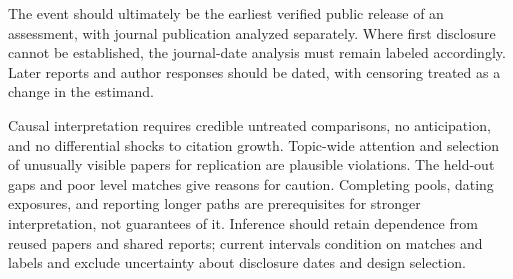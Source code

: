 The event should ultimately be the earliest verified public release of an assessment, with journal publication analyzed separately. Where first disclosure cannot be established, the journal-date analysis must remain labeled accordingly. Later reports and author responses should be dated, with censoring treated as a change in the estimand.

Causal interpretation requires credible untreated comparisons, no anticipation, and no differential shocks to citation growth. Topic-wide attention and selection of unusually visible papers for replication are plausible violations. The held-out gaps and poor level matches give reasons for caution. Completing pools, dating exposures, and reporting longer paths are prerequisites for stronger interpretation, not guarantees of it. Inference should retain dependence from reused papers and shared reports; current intervals condition on matches and labels and exclude uncertainty about disclosure dates and design selection.
